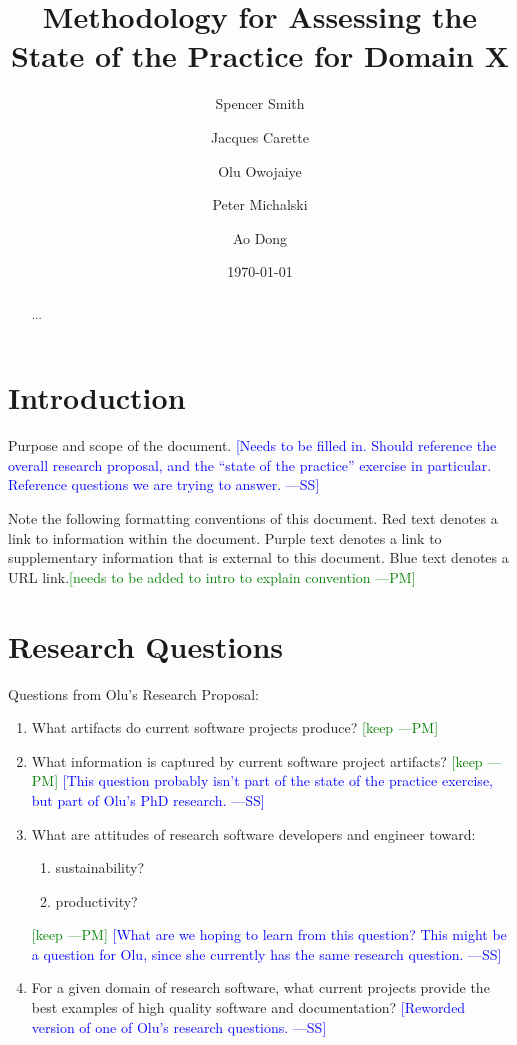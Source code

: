 \documentclass[letterpaper,cleveref]{lipics-v2019}
\title{Methodology for Assessing the State of the Practice for Domain X}
\author{Spencer Smith}{McMaster University, Canada}{smiths@mcmaster.ca}{}{}
\author{Jacques Carette}{McMaster University, Canada}{carette@mcmaster.ca}{}{}
\author{Olu Owojaiye}{McMaster University, Canada}{owojaiyo@mcmaster.ca}{}{}
\author{Peter Michalski}{McMaster University, Canada}{michap@mcmaster.ca}{}{}
\author{Ao Dong}{McMaster University, Canada}{donga9@mcmaster.ca}{}{}
\date{\today}
\newcommand{\authornote}[3]{\textcolor{#1}{[#3 ---#2]}}
\newcommand{\authornote}[3]{}
\newcommand{\wss}[1]{\authornote{blue}{SS}{#1}} %
\newcommand{\pmi}[1]{\authornote{green}{PM}{#1}} %
\theoremstyle{definition}
\begin{document}
\maketitle

\begin{abstract}
	...
\end{abstract}

\tableofcontents

\section{Introduction} \label{SecIntroduction}

Purpose and scope of the document.  \wss{Needs to be filled in.  Should
  reference the overall research proposal, and the ``state of the practice''
  exercise in particular.  Reference questions we are trying to answer.}

Note the following formatting conventions of this document. Red text denotes a
link to information within the document. Purple text denotes a link to
supplementary information that is external to this document. Blue text denotes a
URL link.\pmi{needs to be added to intro to explain convention}

\section{Research Questions}\label{ResearchQuestions}

Questions from Olu's Research Proposal:

\begin{enumerate}
\item What artifacts do current software projects produce?  \pmi{keep}
\item What information is captured by current software project
  artifacts? \pmi{keep} \wss{This question probably isn't part of the state of
    the practice exercise, but part of Olu's PhD research.}
\item What are attitudes of research software developers and engineer toward:
\begin{enumerate}
\item sustainability?
\item productivity?
\end{enumerate} \pmi{keep} \wss{What are we hoping to learn from this question?
  This might be a question for Olu, since she currently has the same research question.}
\item For a given domain of research software, what current projects provide the
  best examples of high quality software and documentation? \wss{Reworded
    version of one of Olu's research questions.}
\end{enumerate}
\end{document}
